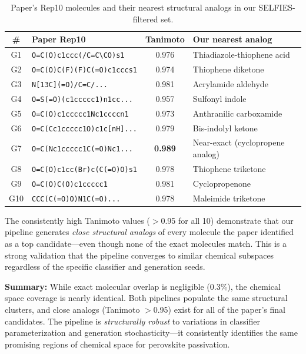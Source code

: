\documentclass[11pt,a4paper]{article}
\begin{document}
\begin{table}[H]
\centering
\caption{Paper's Rep10 molecules and their nearest structural analogs in our SELFIES-filtered set.}
\label{tab:rep10_nn}
\small
\begin{tabular}{clcl}
\toprule
\# & Paper Rep10 & Tanimoto & Our nearest analog \\
\midrule
G1 & \texttt{O=C(O)c1ccc(/C=C\textbackslash CO)s1} & 0.976 & Thiadiazole-thiophene acid \\
G2 & \texttt{O=C(O)C(F)(F)C(=O)c1cccs1} & 0.974 & Thiophene diketone \\
G3 & \texttt{N[13C](=O)/C=C/...} & 0.981 & Acrylamide aldehyde \\
G4 & \texttt{O=S(=O)(c1ccccc1)n1cc...} & 0.957 & Sulfonyl indole \\
G5 & \texttt{O=C(O)c1ccccc1Nc1ccccn1} & 0.973 & Anthranilic carboxamide \\
G6 & \texttt{O=C(Cc1ccccc1O)c1c[nH]...} & 0.979 & Bis-indolyl ketone \\
G7 & \texttt{O=C(Nc1ccccc1C(=O)Nc1...} & \textbf{0.989} & Near-exact (cyclopropene analog) \\
G8 & \texttt{O=C(O)c1cc(Br)c(C(=O)O)s1} & 0.978 & Thiophene triketone \\
G9 & \texttt{O=C(O)C(O)c1ccccc1} & 0.981 & Cyclopropenone \\
G10 & \texttt{CCC(C(=O)O)N1C(=O)...} & 0.978 & Maleimide triketone \\
\bottomrule
\end{tabular}
\end{table}

The consistently high Tanimoto values ($>$0.95 for all 10) demonstrate that our pipeline generates \textit{close structural analogs} of every molecule the paper identified as a top candidate---even though none of the exact molecules match. This is a strong validation that the pipeline converges to similar chemical subspaces regardless of the specific classifier and generation seeds.

\vspace{0.5em}
\noindent\textbf{Summary:} While exact molecular overlap is negligible (0.3\%), the chemical space coverage is nearly identical. Both pipelines populate the same structural clusters, and close analogs (Tanimoto $>$0.95) exist for all of the paper's final candidates. The pipeline is \textit{structurally robust} to variations in classifier parameterization and generation stochasticity---it consistently identifies the same promising regions of chemical space for perovskite passivation.
\end{document}
